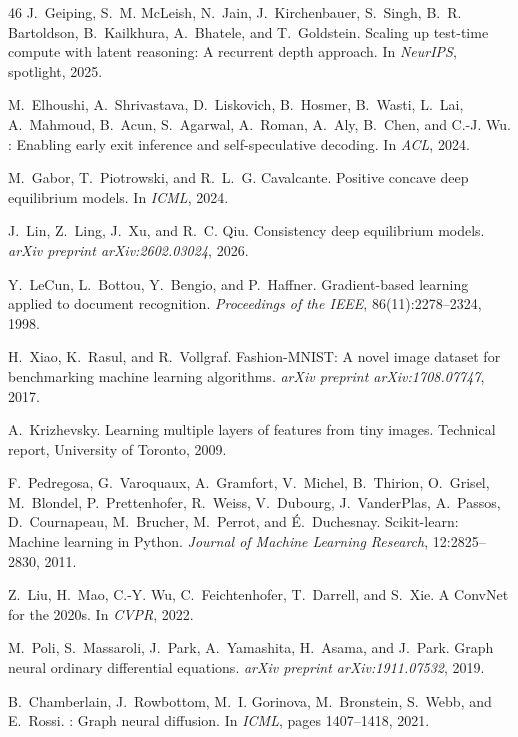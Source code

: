 \documentclass{article}
\theoremstyle{remark}
\begin{document}
\begin{thebibliography}{46}
J.~Geiping, S.~M. McLeish, N.~Jain, J.~Kirchenbauer, S.~Singh,
  B.~R. Bartoldson, B.~Kailkhura, A.~Bhatele, and T.~Goldstein.
\newblock Scaling up test-time compute with latent reasoning: A recurrent depth
  approach.
\newblock In \emph{NeurIPS}, spotlight, 2025.

M.~Elhoushi, A.~Shrivastava, D.~Liskovich, B.~Hosmer, B.~Wasti,
  L.~Lai, A.~Mahmoud, B.~Acun, S.~Agarwal, A.~Roman, A.~Aly,
  B.~Chen, and C.-J. Wu.
: Enabling early exit inference and self-speculative
  decoding.
\newblock In \emph{ACL}, 2024.

M.~Gabor, T.~Piotrowski, and R.~L.~G. Cavalcante.
\newblock Positive concave deep equilibrium models.
\newblock In \emph{ICML}, 2024.

J.~Lin, Z.~Ling, J.~Xu, and R.~C. Qiu.
\newblock Consistency deep equilibrium models.
\newblock \emph{arXiv preprint arXiv:2602.03024}, 2026.

Y.~LeCun, L.~Bottou, Y.~Bengio, and P.~Haffner.
\newblock Gradient-based learning applied to document recognition.
\newblock \emph{Proceedings of the IEEE}, 86(11):2278--2324, 1998.

H.~Xiao, K.~Rasul, and R.~Vollgraf.
\newblock Fashion-{MNIST}: A novel image dataset for benchmarking machine
  learning algorithms.
\newblock \emph{arXiv preprint arXiv:1708.07747}, 2017.

A.~Krizhevsky.
\newblock Learning multiple layers of features from tiny images.
\newblock Technical report, University of Toronto, 2009.

F.~Pedregosa, G.~Varoquaux, A.~Gramfort, V.~Michel, B.~Thirion, O.~Grisel,
  M.~Blondel, P.~Prettenhofer, R.~Weiss, V.~Dubourg, J.~VanderPlas,
  A.~Passos, D.~Cournapeau, M.~Brucher, M.~Perrot, and {\'E}.~Duchesnay.
\newblock Scikit-learn: Machine learning in {Python}.
\newblock \emph{Journal of Machine Learning Research}, 12:2825--2830, 2011.

Z.~Liu, H.~Mao, C.-Y. Wu, C.~Feichtenhofer, T.~Darrell, and S.~Xie.
\newblock A ConvNet for the 2020s.
\newblock In \emph{CVPR}, 2022.

M.~Poli, S.~Massaroli, J.~Park, A.~Yamashita, H.~Asama, and J.~Park.
\newblock Graph neural ordinary differential equations.
\newblock \emph{arXiv preprint arXiv:1911.07532}, 2019.

B.~Chamberlain, J.~Rowbottom, M.~I. Gorinova, M.~Bronstein, S.~Webb, and E.~Rossi.
: Graph neural diffusion.
\newblock In \emph{ICML}, pages 1407--1418, 2021.

\end{thebibliography}
\end{document}
